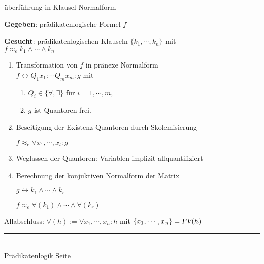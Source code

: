 \documentclass{slides}
\newcommand{\myrule}{\rule{20cm}{1mm}\\ }
\newcommand{\FV}{\textsl{FV}}
\newcounter{mypage}
\begin{document}
\begin{slide}{}
\normalsize
\begin{center}
\"{u}berf\"{u}hrung in Klausel-Normalform
\end{center}
\vspace{0.5cm}

\footnotesize
\textbf{Gegeben}: pr\"{a}dikatenlogische Formel $f$

\textbf{Gesucht}: pr\"{a}dikatenlogischen Klauseln $\{k_1,\cdots,k_n\}$ mit \\[0.1cm]
\hspace*{1.3cm} $f \approx_e k_1 \wedge \cdots \wedge k_n$
\begin{enumerate}
\item Transformation von $f$ in pr\"{a}nexe Normalform 
      \\[0.3cm]
      \hspace*{1.3cm}
      $f \leftrightarrow Q_1 x_1: \cdots Q_m x_m: g$ \quad mit
      \begin{enumerate}
      \item $Q_i \in \{\forall, \exists\}$ f\"{u}r $i=1,\cdots,m$,
      \item $g$ ist Quantoren-frei.
      \end{enumerate}
\item Beseitigung der Existenz-Quantoren durch Skolemisierung

       $f \approx_e \forall x_1, \cdots, x_l: g$
\item Weglassen der Quantoren: Variablen implizit allquantifiziert
\item Berechnung der konjuktiven Normalform der Matrix

      \hspace*{1.3cm} $g \leftrightarrow k_1 \wedge \cdots \wedge k_r$

      $f \approx_e \forall(k_1) \wedge \cdots \wedge \forall(k_r)$
\end{enumerate}
Allabschluss: $\forall(h) := \forall x_1, \cdots, x_n:h$ mit $\{x_1,\cdots,x_n\} = \FV(h)$


\vspace*{\fill}
\tiny \addtocounter{mypage}{1}
\myrule
Pr\"{a}dikatenlogik   \hspace*{\fill} Seite 
\end{slide}

\end{document}
